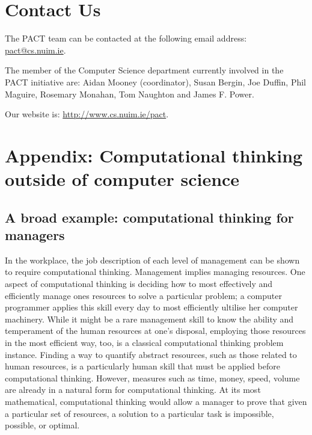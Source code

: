 \documentclass[a4paper]{article}
\begin{document}
\section{Contact Us} \label{Sect:ContactUs}
The PACT team can be contacted at the following email address: \url{pact@cs.nuim.ie}.

The member of the Computer Science department currently involved in the PACT initiative are:
Aidan Mooney (coordinator),
Susan Bergin,
Joe Duffin,
Phil Maguire,
Rosemary Monahan,
Tom Naughton and
James F. Power. 

Our website is: \url{http://www.cs.nuim.ie/pact}.





\appendix

\newpage

\section{Appendix: Computational thinking outside of computer science}\label{apx:CTOutside}

\subsection{A broad example: computational thinking for managers}

In the workplace, the job description of each level of management can be shown to require computational thinking.
Management implies managing resources.
One aspect of computational thinking is deciding how to most effectively and efficiently manage ones resources to solve a particular problem; a computer programmer applies this skill every day to most efficiently ultilise her computer machinery.
While it might be a rare management skill to know the ability and temperament of the human resources at one's disposal, employing those resources in the most efficient way, too, is a classical computational thinking problem instance.
Finding a way to quantify abstract resources, such as those related to human resources, is a particularly human skill that must be applied before computational thinking.
However, measures such as time, money, speed, volume are already in a natural form for computational thinking.
At its most mathematical, computational thinking would allow a manager to prove that given a particular set of resources, a solution to a particular task is impossible, possible, or optimal.

\end{document}
